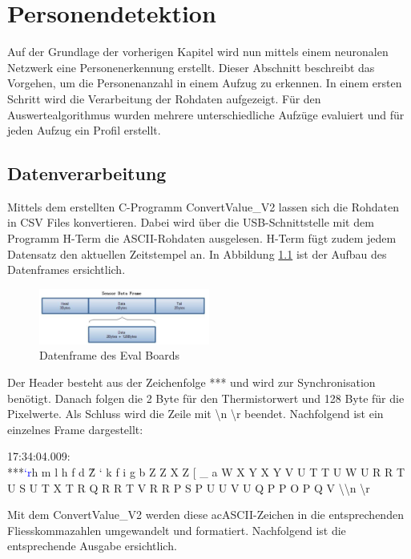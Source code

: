 \chapter{Personendetektion}
\label{chap:Personendetektion}

Auf der Grundlage der vorherigen Kapitel wird nun mittels einem neuronalen Netzwerk eine Personenerkennung erstellt. Dieser Abschnitt beschreibt das Vorgehen, um die Personenanzahl in einem Aufzug zu erkennen. In einem ersten Schritt wird die Verarbeitung der Rohdaten aufgezeigt. Für den Auswertealgorithmus wurden mehrere unterschiedliche Aufzüge evaluiert und für jeden Aufzug ein Profil erstellt. 


\section{Datenverarbeitung}

Mittels dem erstellten C-Programm ConvertValue\_V2 lassen sich die Rohdaten in \ac{CSV} Files konvertieren. Dabei wird über die USB-Schnittstelle mit dem Programm H-Term die \ac{ASCII}-Rohdaten ausgelesen. H-Term fügt zudem jedem Datensatz den aktuellen Zeitstempel an. In Abbildung \ref{fig:Dataframe} ist der Aufbau des Datenframes ersichtlich.

\begin{figure}[H]
	\centering
	\includegraphics[width=0.5\textwidth]
	{fig/Dataframe}
	\caption[Datenframedes EVAL Boards]{Datenframe des Eval Boards}
	\label{fig:Dataframe}
\end{figure}

Der Header besteht aus der Zeichenfolge *** und wird zur Synchronisation benötigt. Danach folgen die 2 Byte für den Thermistorwert und 128 Byte für die Pixelwerte. Als Schluss wird die Zeile mit \textbackslash n \textbackslash r beendet.
Nachfolgend ist ein einzelnes Frame dargestellt:

17:34:04.009: \\
***\textcolor{blue}{‘r}h m l h f d \^ Z ` k f i g b Z Z X Z [ \_ a W X Y X Y V U T T U W U R R T U S U T X T R Q R R T V R R P S P U U V U Q P P O P Q V \textbackslash \textbackslash n \textbackslash r

Mit dem ConvertValue_V2 werden diese ac{ASCII}-Zeichen in die entsprechenden Fliesskommazahlen umgewandelt und formatiert. Nachfolgend ist die entsprechende Ausgabe ersichtlich.

